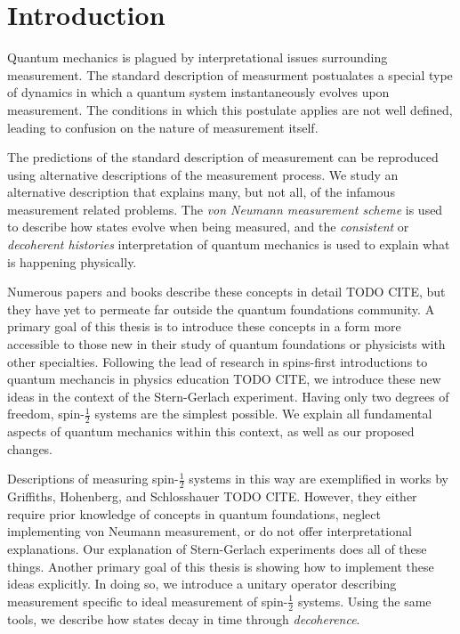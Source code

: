 \chapter{Introduction}

Quantum mechanics is plagued by interpretational issues surrounding measurement. The
standard description of measurment postualates a special type of dynamics in which a quantum system instantaneously evolves upon measurement. The conditions in which this postulate applies are not well defined, leading to confusion on the nature of measurement itself.

The predictions of the standard description of measurement can be reproduced using alternative
descriptions of the measurement process. We study an alternative description that explains many, but not all,  of the infamous measurement related problems. The \textit{von Neumann measurement scheme} is used to describe how states evolve when being measured, and the \textit{consistent} or \textit{decoherent histories} interpretation of quantum mechanics is used to explain what is happening physically.

Numerous papers and books describe these concepts in detail TODO CITE, but they have yet to permeate
far outside the quantum foundations community. A primary goal of this thesis is to introduce
these concepts in a form more accessible to those new in their study of quantum foundations or physicists with other specialties. Following the lead of research in spins-first introductions to quantum mechancis in physics education TODO CITE, we introduce these new ideas in the context of the Stern-Gerlach experiment. Having only two degrees of freedom, spin-$\frac{1}{2}$ systems are the simplest possible. We explain all fundamental aspects of quantum mechanics within this context, as well as our proposed changes.

Descriptions of measuring spin-$\frac{1}{2}$ systems in this way are exemplified
in works by Griffiths, Hohenberg, and Schlosshauer TODO CITE. However, they either require prior knowledge
of concepts in quantum foundations, neglect implementing von Neumann measurement, or do not offer interpretational explanations. Our explanation of Stern-Gerlach experiments does all of these things. Another primary goal of this thesis is showing how to implement these ideas explicitly. In doing so, we introduce a  unitary operator describing measurement specific to ideal measurement of spin-$\frac{1}{2}$ systems. Using the same tools, we describe how states decay in time through \textit{decoherence}.

